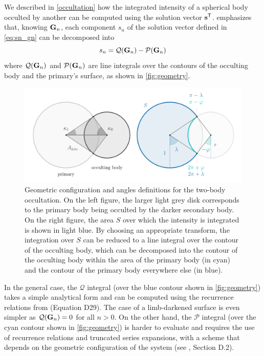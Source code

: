 \documentclass[modern]{aastex631}
\begin{document}
We described in \autoref{occultation} how the integrated intensity of a spherical body occulted by another can be computed using the solution vector ${\mathbf{s}}^\mathsf{T}$. \cite{pal2012} emphasizes that, knowing ${\mathbf{G}}_n$, each component $s_n$ of the solution vector defined in \autoref{eq:sn_gn} can be decomposed into
\begin{equation}
    \label{eq:QP}
    s_n = \mathcal{Q}(\bvec{G}_n) - \mathcal{P}(\bvec{G}_n)
\end{equation}
where $\mathcal{Q}({\mathbf{G}}_n)$ and $\mathcal{P}({\mathbf{G}}_n)$ are line integrals over the contours of the occulting body and the primary's surface, as shown in \autoref{fig:geometry}.
%
\begin{figure}[H]
    \begin{center}
        \includegraphics[width=\textwidth]{../workflows/figures/occultation_geometry.pdf}
        \caption{Geometric configuration and angles definitions for the two-body occultation. On the left figure, the larger light grey disk corresponds to the primary body being occulted by the darker secondary body. On the right figure, the area $S$ over which the intensity is integrated is shown in light blue. By choosing an appropriate transform, the integration over $S$ can be reduced to a line integral over the contour of the occulting body, which can be decomposed into the contour of the occulting body within the area of the primary body (in cyan) and the contour of the primary body everywhere else (in blue). }
        \label{fig:geometry}
    \end{center}
\end{figure}
%
In the general case, the $\mathcal{Q}$ integral (over the blue contour shown in \autoref{fig:geometry}) takes a simple analytical form and can be computed using the recurrence relations from \cite{starry} (Equation D29). The case of a limb-darkened surface is even simpler as $\mathcal{Q}({\mathbf{G}}_n) = 0$ for all $n > 0$. On the other hand, the $\mathcal{P}$ integral (over the cyan contour shown in \autoref{fig:geometry}) is harder to evaluate and requires the use of recurrence relations and truncated series expansions, with a scheme that depends on the geometric configuration of the system (see \citealt{starry}, Section D.2).\\\\
\end{document}
